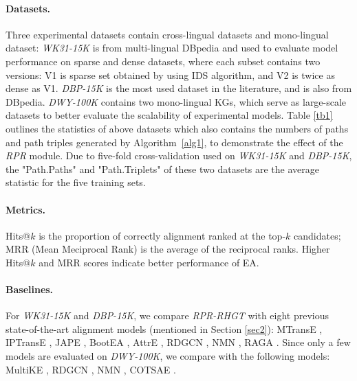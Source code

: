 \documentclass{article}
\begin{document}
\paragraph{Datasets.}
Three experimental datasets contain cross-lingual datasets and mono-lingual dataset:
\textit{WK31-15K} \cite{sun_benchmarking_2020} is from multi-lingual DBpedia and used to evaluate model performance on sparse and dense datasets, where each subset contains two versions: V1 is sparse set obtained by using IDS algorithm, and V2 is twice as dense as V1.
\textit{DBP-15K} \cite{sun_cross-lingual_2017} is the most used dataset in the literature, and
is also from DBpedia.
\textit{DWY-100K} \cite{sun_bootstrapping_2018} contains two mono-lingual KGs, which serve as large-scale datasets to better evaluate the scalability of experimental models.
%
Table \ref{tb1} outlines the statistics of above datasets which also contains the numbers of paths and path triples generated by Algorithm~\ref{alg1}, to demonstrate the effect of the \textit{RPR} module.
Due to five-fold cross-validation used on \textit{WK31-15K} and \textit{DBP-15K}, the "Path.Paths" and "Path.Triplets" of these two datasets are the average statistic for the five training sets.

\paragraph{Metrics.}
Hits@$k$ is the proportion of correctly alignment ranked at the top-$k$ candidates;
MRR (Mean Meciprocal Rank) is the average of the reciprocal ranks.
Higher Hits@$k$ and MRR scores indicate better performance of EA.


\paragraph{Baselines.} %
For \textit{WK31-15K} and \textit{DBP-15K}, we compare \textit{RPR-RHGT} with eight previous state-of-the-art alignment models (mentioned in Section \ref{sec2}):
MTransE \cite{chen_multilingual_2017}, IPTransE \cite{zhu_iterative_2017}, 
JAPE \cite{sun_cross-lingual_2017}, BootEA \cite{sun_bootstrapping_2018},
AttrE \cite{trisedya_entity_2019}, RDGCN \cite{wu_relation-aware_2019}, 
NMN \cite{wu_neighborhood_2020}, RAGA \cite{zhu_raga_2021}.
Since only a few models are evaluated on \textit{DWY-100K}, we compare with the following models: 
MultiKE \cite{zhang_multi-view_2019}, RDGCN \cite{wu_relation-aware_2019}, NMN \cite{wu_neighborhood_2020}, COTSAE \cite{yang_cotsae_2020}.
\end{document}
